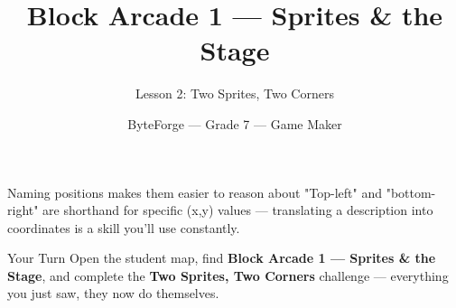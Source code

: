 \documentclass[aspectratio=169]{beamer}
\title{Block Arcade 1 — Sprites \& the Stage}
\subtitle{Lesson 2: Two Sprites, Two Corners}
\author{ByteForge --- Grade 7 --- Game Maker}
\date{}
\begin{document}
\begin{frame}
    \titlepage
\end{frame}

\begin{frame}{Naming positions makes them easier to reason about}
    \Large
    "Top-left" and "bottom-right" are shorthand for specific (x,y) values — translating a description into coordinates is a skill you'll use constantly.
\end{frame}

\begin{frame}{Your Turn}
    \Large
    Open the student map, find \textbf{Block Arcade 1 — Sprites \& the Stage}, and complete
    the \textbf{Two Sprites, Two Corners} challenge --- everything you just saw, they now do themselves.
\end{frame}
\end{document}

